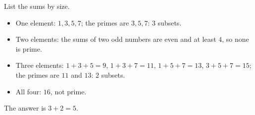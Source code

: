 List the sums by size.
\begin{itemize}
\item One element: $1,3,5,7$; the primes are $3,5,7$: $3$ subsets.
\item Two elements: the sums of two odd numbers are even and at least $4$, so none is prime.
\item Three elements: $1+3+5=9$, $1+3+7=11$, $1+5+7=13$, $3+5+7=15$; the primes are $11$ and $13$: $2$ subsets.
\item All four: $16$, not prime.
\end{itemize}
The answer is $3+2=\boxed{5}$.
